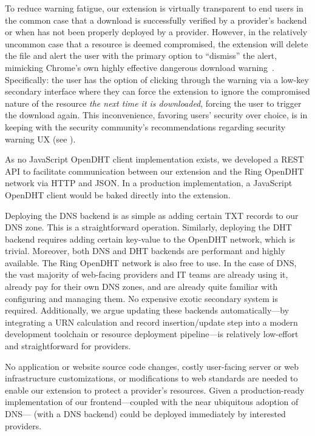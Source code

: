 To reduce warning fatigue, our extension is virtually transparent to end users
in the common case that a download is successfully verified by a provider's
backend or when \SYSTEM{} has not been properly deployed by a provider. However,
in the relatively uncommon case that a resource is deemed compromised, the
extension will delete the file and alert the user with the primary option to
``dismiss'' the alert, mimicking Chrome's own highly effective dangerous
download warning~\cite{ChromeClickThrough}. Specifically: the user has the
option of clicking through the warning via a low-key secondary interface where
they can force the extension to ignore the compromised nature of the resource
\emph{the next time it is downloaded}, forcing the user to trigger the download
again. This inconvenience, favoring users' security over choice, is in keeping
with the security community's recommendations regarding security warning UX (see
).

As no JavaScript OpenDHT client implementation exists, we developed a REST API
to facilitate communication between our extension and the Ring OpenDHT network
via HTTP and JSON. In a production implementation, a JavaScript OpenDHT client
would be baked directly into the extension.

Deploying the DNS backend is as simple as adding certain TXT records to our DNS
zone. This is a straightforward operation. Similarly, deploying the DHT backend
requires adding certain key-value to the OpenDHT network, which is trivial.
Moreover, both DNS and DHT backends are performant and highly available. The
Ring OpenDHT network is also free to use. In the case of DNS, the vast majority
of web-facing providers and IT teams are already using it, already pay for their
own DNS zones, and are already quite familiar with configuring and managing
them. No expensive exotic secondary system is required. Additionally, we argue
updating these backends automatically---by integrating a URN calculation and
record insertion/update step into a modern development toolchain or resource
deployment pipeline---is relatively low-effort and straightforward for
providers.

No application or website source code changes, costly user-facing server or web
infrastructure customizations, or modifications to web standards are needed to
enable our extension to protect a provider's resources. Given a production-ready
implementation of our frontend---coupled with the near ubiquitous adoption of
DNS---\SYSTEM{} (with a DNS backend) could be deployed immediately by interested
providers.

